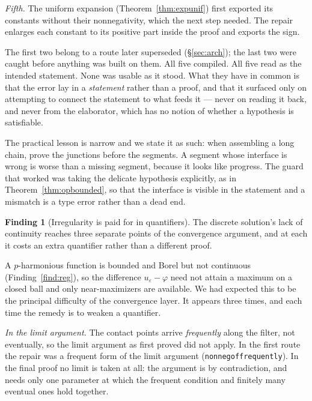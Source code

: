\documentclass[11pt,reqno]{amsart}
\newcommand{\LEANREF}[1]{\texttt{\small\def\_{\textunderscore\allowbreak}#1}}
\newcommand{\eps}{\varepsilon}
\theoremstyle{plain}
\theoremstyle{definition}
\newtheorem{finding}[theorem]{Finding}
\begin{document}
\emph{Fifth.} The uniform expansion (Theorem~\ref{thm:expunif}) first exported
its constants without their nonnegativity, which the next step needed. The
repair enlarges each constant to its positive part inside the proof and exports
the sign.

The first two belong to a route later superseded (\S\ref{sec:arch}); the last
two were caught before anything was built on them. All five compiled. All five
read as the intended statement. None was usable as it stood.
What they have in common is that the error lay in a \emph{statement} rather
than a proof, and that it surfaced only on attempting to connect the statement
to what feeds it --- never on reading it back, and never from the elaborator,
which has no notion of whether a hypothesis is satisfiable.

The practical lesson is narrow and we state it as such: when assembling a long
chain, prove the junctions before the segments. A segment whose interface is
wrong is worse than a missing segment, because it looks like progress. The
guard that worked was taking the delicate hypothesis explicitly, as in
Theorem~\ref{thm:opbounded}, so that the interface is visible in the statement
and a mismatch is a type error rather than a dead end.

\begin{finding}[Irregularity is paid for in quantifiers]\label{find:quant}
The discrete solution's lack of continuity reaches three separate points of the
convergence argument, and at each it costs an extra quantifier rather than a
different proof.
\end{finding}

A $p$-harmonious function is bounded and Borel but not continuous
(Finding~\ref{find:reg}), so the difference $u_\eps - \varphi$ need not attain
a maximum on a closed ball and only near-maximizers are available. We had
expected this to be the principal difficulty of the convergence layer. It
appears three times, and each time the remedy is to weaken a quantifier.

\emph{In the limit argument.} The contact points arrive \emph{frequently} along
the filter, not eventually, so the limit argument as first proved did not
apply. In the first route the repair was a frequent form of the limit argument
(\LEANREF{nonneg\_of\_frequently}). In the final proof no limit is taken at
all: the argument is by contradiction, and needs only one parameter at which
the frequent condition and finitely many eventual ones hold together.
\end{document}

